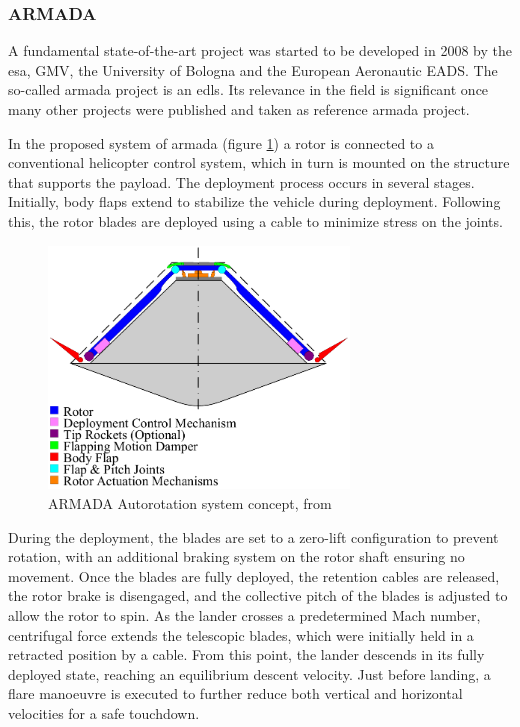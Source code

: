 \subsubsection{ARMADA}

A fundamental state-of-the-art project was started to be developed in 2008  by the \gls{esa}, GMV, the University of Bologna and the European Aeronautic \gls{EADS}. The so-called \gls{armada} project \cite{noauthor_armada_nodate} is an \gls{edls}. Its relevance in the field is significant once many other projects were published and taken as reference \gls{armada} project. 

 In the proposed system of \gls{armada} (figure \ref{fig:armada_concept}) a rotor is connected to a conventional helicopter control system, which in turn is mounted on the structure that supports the payload. The deployment process occurs in several stages. Initially, body flaps extend to stabilize the vehicle during deployment. Following this, the rotor blades are deployed using a cable to minimize stress on the joints. 

\begin{figure}[!htb]
    \centering
    \includegraphics[width=8cm]{Figures/introduction/armada_concept_vehicle.png}
    \caption{ARMADA Autorotation system concept, from \cite{noauthor_armada_nodate} }
    \label{fig:armada_concept}
\end{figure}

During the deployment, the blades are set to a zero-lift configuration to prevent rotation, with an additional braking system on the rotor shaft ensuring no movement. Once the blades are fully deployed, the retention cables are released, the rotor brake is disengaged, and the collective pitch of the blades is adjusted to allow the rotor to spin. As the lander crosses a predetermined Mach number, centrifugal force extends the telescopic blades, which were initially held in a retracted position by a cable. From this point, the lander descends in its fully deployed state, reaching an equilibrium descent velocity. Just before landing, a flare manoeuvre is executed to further reduce both vertical and horizontal velocities for a safe touchdown.

